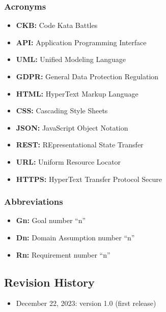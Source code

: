 \subsubsection{Acronyms}
\begin{itemize}
    \item {\textbf{CKB:} Code Kata Battles}
    \item {\textbf{API:} Application Programming Interface}
    \item {\textbf{UML:} Unified Modeling Language}
    \item {\textbf{GDPR:} General Data Protection Regulation}
    \item {\textbf{HTML:} HyperText Markup Language}
    \item {\textbf{CSS:} Cascading Style Sheets}
    \item {\textbf{JSON:} JavaScript Object Notation}
    \item {\textbf{REST:} REpresentational State Transfer}
    \item {\textbf{URL:} Uniform Resource Locator}
    \item {\textbf{HTTPS:} HyperText Transfer Protocol Secure}
\end{itemize}
\subsubsection{Abbreviations}
\begin{itemize}
    \item {\textbf{Gn:} Goal number “n”}
    \item {\textbf{Dn:} Domain Assumption number “n”}
    \item {\textbf{Rn:} Requirement number “n”}
\end{itemize}
\subsection{Revision History}
\begin{itemize}
    \item December 22, 2023: version 1.0 (first release)
\end{itemize}
